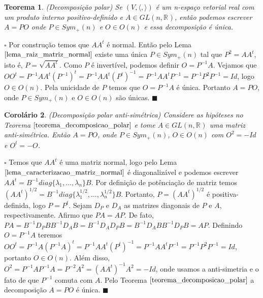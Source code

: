 \documentclass[12pt]{book}
\newtheorem{teorema}{Teorema}[section]
\newtheorem{corolario}[teorema]{Corolário}
\newenvironment{prova}[1]{$\square$ #1}{\hfill$\blacksquare$}
\newcommand{\generalgroup}[2]{GL(#1, #2)}
\newcommand{\generalgroupreal}[1]{\generalgroup{#1}{\real{}}}
\newcommand{\matrizortogonal}[1]{O(#1)}
\newcommand{\matrizsimetricapositiva}[1]{Sym_{+}(#1)}
\newcommand{\produtointerno}[2]{\langle #1, #2 \rangle}
\newcommand{\real}[1]{\mathbb{R}^{#1}}
\begin{document}
	\begin{teorema}\label{teorema_decomposicao_polar}
		(Decomposição polar) Se $(V, \produtointerno{}{})$ é um n-espaço vetorial real com um produto interno positivo-definido e $A \in \generalgroupreal{n}$, então podemos escrever $A=PO$ onde $P \in  \matrizsimetricapositiva{n}$ e $O \in \matrizortogonal{n}$ e essa decomposição é única.
	\end{teorema}
	\begin{prova}
		Por construção temos que $AA^{t}$ é normal. Então pelo Lema $\ref{lema_raiz_matriz_normal}$ existe uma única $P \in \matrizsimetricapositiva{n}$ tal que $P^{2} = AA^{t}$, isto é, $P = \sqrt{AA^{t}}$. Como $P$ é invertível, podemos definir $O = P^{-1}A$. Vejamos que $OO^{t} = P^{-1}AA^{t}(P^{-1})^{t} = P^{-1}AA^{t}(P^{t})^{-1} = P^{-1}AA^{t}P^{-1} = P^{-1}P^{2}P^{-1} = Id$, logo $O \in \matrizortogonal{n}$. Pela unicidade de $P$ temos que $O=P^{-1}A$ é única. Portanto $A=PO$, onde $P \in \matrizsimetricapositiva{n}$ e $O \in \matrizortogonal{n}$ são únicas.
	\end{prova}
	
	\begin{corolario}\label{corolario_decomposicao_matriz_antisimetrica}
		(Decomposição polar anti-simétrica) Considere as hipóteses no Teorema $\ref{teorema_decomposicao_polar}$ e tome $A \in \generalgroupreal{n}$ uma matriz anti-simétrica. Então $A = PO$, onde $P \in \matrizsimetricapositiva{n}$, $O \in \matrizortogonal{n}$ com  $O^{2} = -Id$ e $O^{t} = -O$.
	\end{corolario}
	\begin{prova}
		Temos que $AA^{t}$ é uma matriz normal, logo pelo Lema $\ref{lema_caracterizacao_matriz_normal}$ é diagonalizável e podemos escrever $AA^{t} = B^{-1}diag\{\lambda_{1}, \dots, \lambda_{n}\}B$. Por definição de potênciação de matriz temos $(AA^{t})^{1/2} =B^{-1}diag\{\lambda_{1}^{1/2}, \dots, \lambda_{n}^{1/2}\}B$. Portanto, $P=(AA^{t})^{1/2}$ é positiva-definida, logo $P=P^{t}$. Sejam $D_{P}$ e $D_{A}$ as matrizes diagonais de $P$ e $A$, respectivamente. Afirmo que $PA = AP$. De fato, $PA = B^{-1}D_{P}B B^{-1}D_{A}B = B^{-1}D_{A} D_{P}B = B^{-1}D_{A}B B^{-1}D_{P}B = AP$. Definindo $O = P^{-1}A$ teremos $OO^{t} = P^{-1}A(P^{-1}A)^{t} = P^{-1}AA^{t}(P^{t})^{-1} = P^{-1}AA^{t}P^{-1} = P^{-1}P^{2}P^{-1}  = Id$, portanto $O \in \matrizortogonal{n}$. Além disso, $O^{2} = P^{-1}AP^{-1}A = P^{-2}A^{2} = (AA^{t})^{-1}A^{2} = -Id$, onde usamos a anti-simetria e o fato de que $P^{-1}$ comuta com $A$. Pelo Teorema $\ref{teorema_decomposicao_polar}$ a decomposição $A=PO$ é única.
	\end{prova}
	
\end{document}
